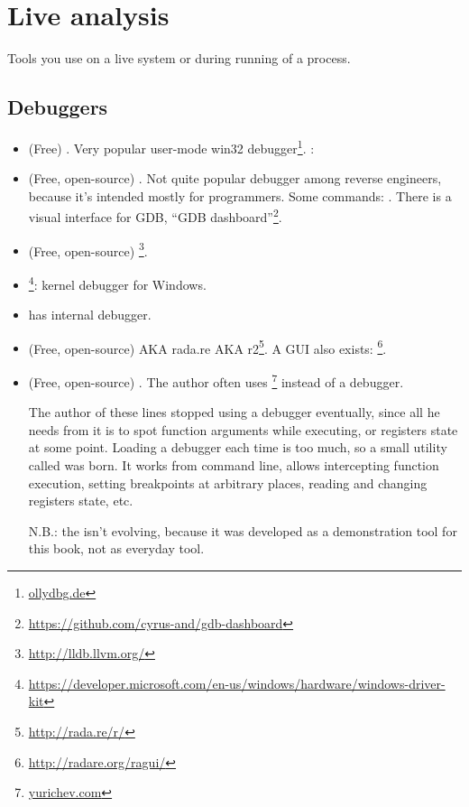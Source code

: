 \section{Live analysis}

Tools you use on a live system or during running of a process.

\subsection{Debuggers}

\myindex{\olly}

\begin{itemize}
\item (Free) .
Very popular user-mode win32 debugger\footnote{\href{http://go.yurichev.com/17032}{ollydbg.de}}.
\ShortHotKeyCheatsheet: 

\item (Free, open-source) .
Not quite popular debugger among reverse engineers, because it's intended mostly for programmers.
Some commands: .
There is a visual interface for GDB, ``GDB dashboard''\footnote{\url{https://github.com/cyrus-and/gdb-dashboard}}.

\item (Free, open-source) \footnote{\url{http://lldb.llvm.org/}}.

\item {}\footnote{\url{https://developer.microsoft.com/en-us/windows/hardware/windows-driver-kit}}:
kernel debugger for Windows.

\item {} has internal debugger.

\item (Free, open-source)  \ac{AKA} rada.re \ac{AKA} r2\footnote{\url{http://rada.re/r/}}.
A GUI also exists: \footnote{\url{http://radare.org/ragui/}}.

\item (Free, open-source) .
\label{tracer}
The author often uses 
\footnote{\href{http://go.yurichev.com/17338}{yurichev.com}}
instead of a debugger.

The author of these lines stopped using a debugger eventually, since all he needs from it is to spot function arguments while
executing, or registers state at some point.
Loading a debugger each time is too much, so a small utility called  was born.
It works from command line, allows intercepting function execution,
setting breakpoints at arbitrary places, reading and changing registers state, etc.

N.B.: the  isn't evolving, because it was developed as a demonstration tool for this book, not as everyday tool.
\end{itemize}

